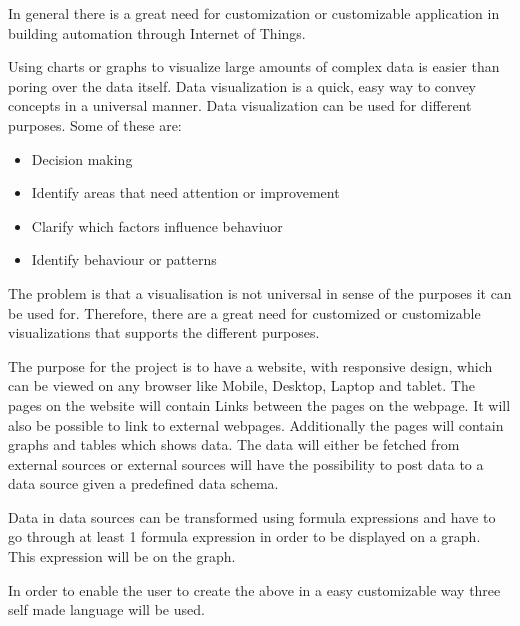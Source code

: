 In general there is a great need for customization or customizable application in building automation through Internet of Things.

Using charts or graphs to visualize large amounts of complex data is easier than poring over the data itself. 
Data visualization is a quick, easy way to convey concepts in a universal manner. Data visualization can be used for different purposes. 
Some of these are:
\begin{itemize}
\item Decision making
\item Identify areas that need attention or improvement
\item Clarify which factors influence behaviuor
\item Identify behaviour or patterns
\end{itemize}

The problem is that a visualisation is not universal in sense of the purposes it can be used for. 
Therefore, there are a great need for customized or customizable visualizations that supports the different purposes. 

The purpose for the project is to have a website, with responsive design, which can be viewed on any browser like Mobile, Desktop, Laptop and tablet. 
The pages on the website will contain Links between the pages on the webpage. 
It will also be possible to link to external webpages. 
Additionally the pages will contain graphs and tables which shows data. 
The data will either be fetched from external sources or external sources will have the possibility to post data to a data source given a predefined data schema. 

Data in data sources can be transformed using formula expressions and have to go through at least 1 formula expression in order to be displayed on a graph. 
This expression will be on the graph. 

In order to enable the user to create the above in a easy customizable way three self made language will be used.


